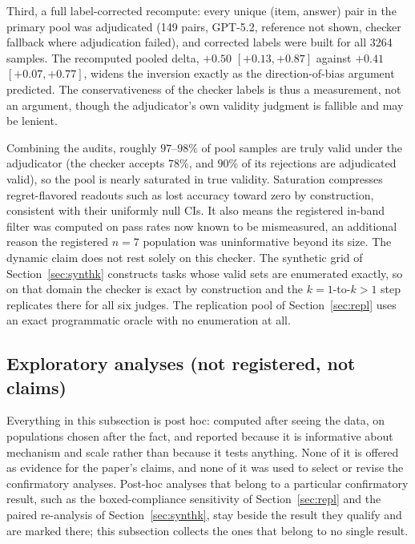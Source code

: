 \documentclass[11pt]{article}
\begin{document}
Third, a full label-corrected recompute: every unique (item, answer) pair in the primary pool was adjudicated (149 pairs, GPT-5.2, reference not shown, checker fallback where adjudication failed), and corrected labels were built for all 3264 samples.
The recomputed pooled delta, $+0.50$ $[+0.13, +0.87]$ against $+0.41$ $[+0.07, +0.77]$, widens the inversion exactly as the direction-of-bias argument predicted.
The conservativeness of the checker labels is thus a measurement, not an argument, though the adjudicator's own validity judgment is fallible and may be lenient.

Combining the audits, roughly $97$--$98\%$ of pool samples are truly valid under the adjudicator (the checker accepts $78\%$, and $90\%$ of its rejections are adjudicated valid), so the pool is nearly saturated in true validity.
Saturation compresses regret-flavored readouts such as lost accuracy toward zero by construction, consistent with their uniformly null CIs.
It also means the registered in-band filter was computed on pass rates now known to be mismeasured, an additional reason the registered $n{=}7$ population was uninformative beyond its size.
The dynamic claim does not rest solely on this checker.
The synthetic grid of Section~\ref{sec:synthk} constructs tasks whose valid sets are enumerated exactly, so on that domain the checker is exact by construction and the $k{=}1$-to-$k{>}1$ step replicates there for all six judges.
The replication pool of Section~\ref{sec:repl} uses an exact programmatic oracle with no enumeration at all.

\subsection{Exploratory analyses (not registered, not claims)}
\label{sec:exploratory}
Everything in this subsection is post hoc: computed after seeing the data, on populations chosen after the fact, and reported because it is informative about mechanism and scale rather than because it tests anything.
None of it is offered as evidence for the paper's claims, and none of it was used to select or revise the confirmatory analyses.
Post-hoc analyses that belong to a particular confirmatory result, such as the boxed-compliance sensitivity of Section~\ref{sec:repl} and the paired re-analysis of Section~\ref{sec:synthk}, stay beside the result they qualify and are marked there; this subsection collects the ones that belong to no single result.
\end{document}
